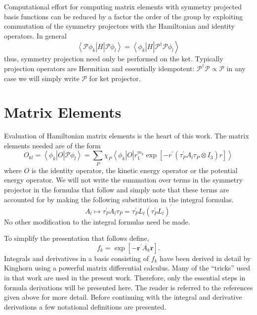 \documentclass[12pt,doublespace]{article}
\begin{document}
Computational effort for computing matrix elements with symmetry projected
basis functions can be reduced by a factor the order of the group by
exploiting commutation of the symmetry projectors with the Hamiltonian and
identity operators. In general 
\begin{equation}
\left\langle \mathcal{P}\phi _{k}\right| H\left| \mathcal{P}\phi
_{l}\right\rangle =\left\langle \phi _{k}\right| H\left| \mathcal{P}%
^{\dagger }\mathcal{P}\phi _{l}\right\rangle
\end{equation}
thus, symmetry projection need only be performed on the ket. Typically
projection operators are Hermitian and essentially idempotent: $\mathcal{P}%
^{\dagger }\mathcal{P}\varpropto \mathcal{P}$ in any case we will simply
write $\mathcal{P}$ for ket projector.

\section{Matrix Elements}

Evaluation of Hamiltonian matrix elements is the heart of this work. The
matrix elements needed are of the form 
\begin{equation*}
O_{kl}=\left\langle \phi _{k}\right| O\left| \mathcal{P}\phi
_{l}\right\rangle =\sum_{P}\chi _{P}\left\langle \phi _{k}\right| O\left|
r_{1}^{m_{k}}\exp \left[ -r^{\prime }\left( \tau _{P}^{\prime }A_{l}\tau
_{P}\otimes I_{3}\right) r\right] \right\rangle
\end{equation*}
where $O$ is the identity operator, the kinetic energy operator or the
potential energy operator. We will not write the summation over terms in the
symmetry projector in the formulas that follow and simply note that these
terms are accounted for by making the following substitution in the integral
formulas. 
\begin{equation}
A_{l}\mapsto \tau _{P}^{\prime }A_{l}\tau _{P}=\tau _{P}^{\prime
}L_{l}\left( \tau _{P}^{\prime }L_{l}\right) ^{\prime }
\end{equation}
No other modification to the integral formulas need be made.

To simplify the presentation that follows define, 
\begin{equation}
f_{k}=\exp \left[ -\mathbf{r}^{\prime }\overline{A_{k}}\mathbf{r}\right] .
\end{equation}
Integrals and derivatives in a basis consisting of $f_{k}$ have been derived
in detail by Kinghorn\cite{Kinghorn95a,Kinghorn95b} using a powerful matrix
differential calculus. Many of the ``tricks'' used in that work are used in
the present work. Therefore, only the essential steps in formula derivations
will be presented here. The reader is referred to the references given above
for more detail. Before continuing with the integral and derivative
derivations a few notational definitions are presented.
\end{document}
